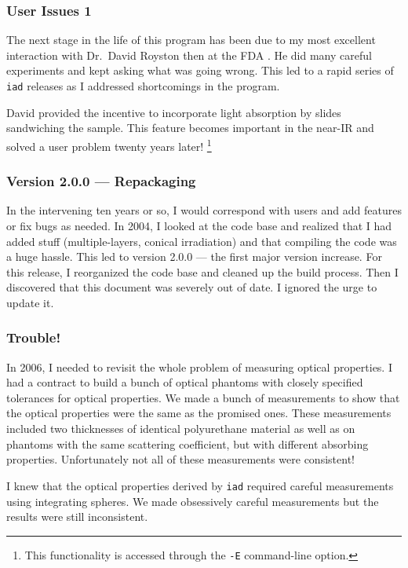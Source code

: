 \documentclass{article}
\newcommand\iadprog{\texttt{iad}}
\begin{document}
\subsubsection*{User Issues 1}

The next stage in the life of this program has been due to my most excellent
interaction with Dr.\ David Royston then at the FDA \cite{royston96}.  He did many careful experiments and kept asking what was going wrong.  This led to a rapid series of \iadprog{}
releases as I addressed shortcomings in the program.

David provided the incentive to incorporate light absorption by slides sandwiching the sample.
This feature becomes important in the near-IR and solved a user problem twenty years later!%
\footnote{This functionality is accessed through the \texttt{-E} command-line option.}

\subsubsection*{Version 2.0.0 --- Repackaging}

In the intervening ten years or so, I would correspond with users and add
features or fix bugs as needed.  In 2004, I looked at the code base and realized that I had added
stuff (multiple-layers, conical irradiation) and that 
compiling the code was a huge hassle.  This led to version 2.0.0 --- the first major version increase.  For this release, I reorganized the code
base and cleaned up the build process.  Then I discovered that this document was
severely out of date.  I ignored the urge to update it.

\subsubsection*{Trouble!}

In 2006, I needed to revisit the whole problem of measuring optical
properties.  I had a contract to build a bunch of optical phantoms with closely
specified tolerances for optical properties.  We made a bunch of measurements
to show that the optical properties were the same as the promised ones.  These measurements 
included two thicknesses of identical polyurethane material as well as on phantoms with the
same scattering coefficient, but with different absorbing properties.  Unfortunately
not all of these measurements were consistent!

I knew that the optical properties derived by \iadprog{} required careful measurements
using integrating spheres.  We made obsessively careful measurements but the results were still
inconsistent.  
\end{document}
